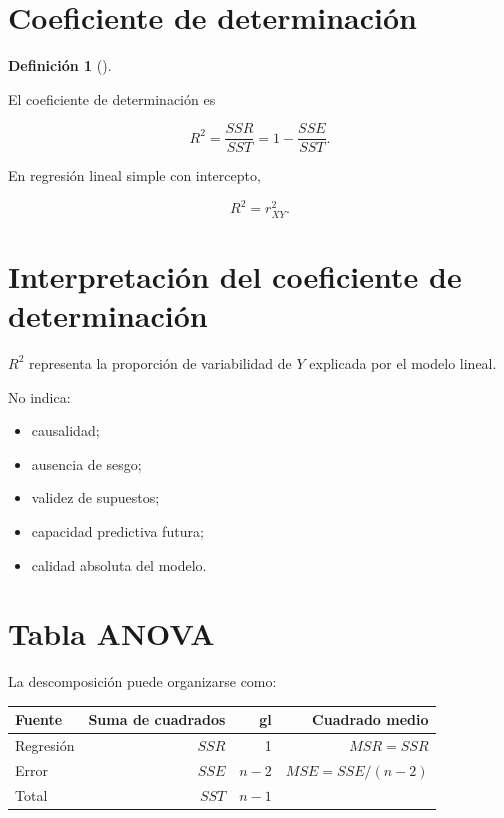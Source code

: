 \documentclass[
  spanish,
  11pt,
  letterpaper,
  DIV=11,
  numbers=noendperiod]{scrreprt}
\newcounter{none} %
\providecommand{\tightlist}{%
  \setlength{\itemsep}{0pt}\setlength{\parskip}{0pt}}
\theoremstyle{definition}
\newtheorem{definition}{Definición}[chapter]
\theoremstyle{plain}
\theoremstyle{definition}
\theoremstyle{remark}
\begin{document}
\section{Coeficiente de
determinación}\label{coeficiente-de-determinaciuxf3n-1}

\begin{definition}[]\protect\hypertarget{def-r2-simple}{}\label{def-r2-simple}

El coeficiente de determinación es

\[
R^2
=
\frac{
SSR
}{
SST
}
=
1-
\frac{
SSE
}{
SST
}.
\]

\end{definition}

En regresión lineal simple con intercepto,

\[
R^2
=
r_{XY}^2.
\]

\section{Interpretación del coeficiente de
determinación}\label{interpretaciuxf3n-del-coeficiente-de-determinaciuxf3n}

\(R^2\) representa la proporción de variabilidad de \(Y\) explicada por
el modelo lineal.

No indica:

\begin{itemize}
\tightlist
\item
  causalidad;
\item
  ausencia de sesgo;
\item
  validez de supuestos;
\item
  capacidad predictiva futura;
\item
  calidad absoluta del modelo.
\end{itemize}

\section{Tabla ANOVA}\label{tabla-anova}

La descomposición puede organizarse como:

{\def\LTcaptype{none} %
\begin{longtable}[]{@{}lrrr@{}}
\toprule\noalign{}
Fuente & Suma de cuadrados & gl & Cuadrado medio \\
\midrule\noalign{}
\endhead
\bottomrule\noalign{}
\endlastfoot
Regresión & \(SSR\) & 1 & \(MSR=SSR\) \\
Error & \(SSE\) & \(n-2\) & \(MSE=SSE/(n-2)\) \\
Total & \(SST\) & \(n-1\) & \\
\end{longtable}
}
\end{document}
